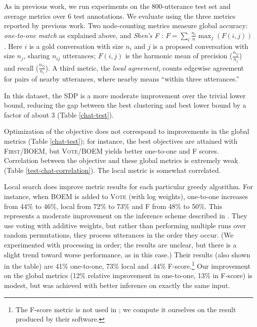 \documentclass[11pt]{article}
\newcommand{\cut}[1]{}
\newcommand{\alg}[1]{\textsc{#1}}
\begin{document}
As in previous work, we run experiments on the 800-utterance test set
and average metrics over 6 test annotations. We evaluate using the
three metrics reported by previous work. Two node-counting metrics
measure global accuracy: {\em one-to-one match} as explained above,
and {\em Shen's F} \cite{Shen06}:
$
F = \sum_i \frac{n_i}{n}\max_j(F(i,j))
$.
Here $i$ is a gold conversation with size $n_i$ and $j$ is a proposed
conversation with size $n_j$, sharing $n_{ij}$ utterances; $F(i,j)$ is
the harmonic mean of precision ($\frac{n_{ij}}{n_j}$) and recall
($\frac{n_{ij}}{n_i}$). A third metric, the {\em local agreement},
counts edgewise agreement for pairs of nearby utterances, where nearby
means ``within three utterances.''

In this dataset, the SDP is a more moderate improvement over the
trivial lower bound, reducing the gap between the best clustering and
best lower bound by a factor of about 3 (Table \ref{chat-test}).

Optimization of the objective does not correspond to improvements in
the global metrics (Table \ref{chat-test}); for instance, the best
objectives are attained with \alg{First}/\alg{BOEM}, but
\alg{Vote}/\alg{BOEM} yields better one-to-one and F
scores. Correlation between the objective and these global metrics is
extremely weak \cut{or slightly anti-correlated} (Table
\ref{test-chat-correlation}). The local metric is somewhat correlated.

Local search does improve metric results for each particular greedy
algorithm. For instance, when \alg{BOEM} is added to \alg{Vote} (with log
weights), one-to-one increases from 44\% to 46\%, local from 72\% to
73\% and F from 48\% to 50\%. This represents a moderate improvement
on the inference scheme described in . They use
voting with additive weights, but rather than performing multiple runs
over random permutations, they process utterances in the order they
occur. (We experimented with processing in order; the results are
unclear, but there is a slight trend toward worse performance, as in
this case.) Their results (also shown in the table) are 41\%
one-to-one, 73\% local and .44\% F-score.\footnote{The F-score metric
  is not used in ; we compute it ourselves on the
  result produced by their software.} Our improvement on the global
metrics (12\% relative improvement in one-to-one, 13\% in F-score) is
modest, but was achieved with better inference on exactly the
same input.
\end{document}
